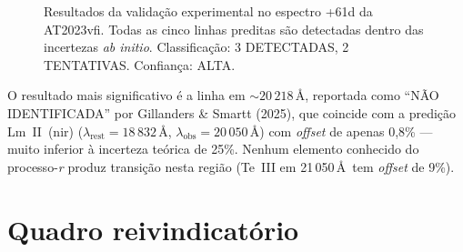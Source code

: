 \documentclass[12pt,a4paper]{article}
\begin{document}
\begin{figure}[H]
\centering
{}
\caption{Resultados da validação experimental no espectro +61d da
AT2023vfi. Todas as cinco linhas preditas são detectadas dentro das
incertezas \textit{ab initio}. Classificação: 3 DETECTADAS, 2
TENTATIVAS. Confiança: ALTA.}
\label{fig:resultados}
\end{figure}

O resultado mais significativo é a linha em ${\sim}20\,218$\,\AA,
reportada como ``NÃO IDENTIFICADA'' por Gillanders \& Smartt (2025),
que coincide com a predição Lm~II~(nir) ($\lambda_{\text{rest}} =
18\,832$\,\AA, $\lambda_{\text{obs}} = 20\,050$\,\AA) com
\textit{offset} de apenas 0,8\% --- muito inferior à incerteza
teórica de 25\%. Nenhum elemento conhecido do processo-\textit{r}
produz transição nesta região (Te~III em 21\,050\,\AA\ tem
\textit{offset} de 9\%).

\newpage
\section{Quadro reivindicatório}
\end{document}
